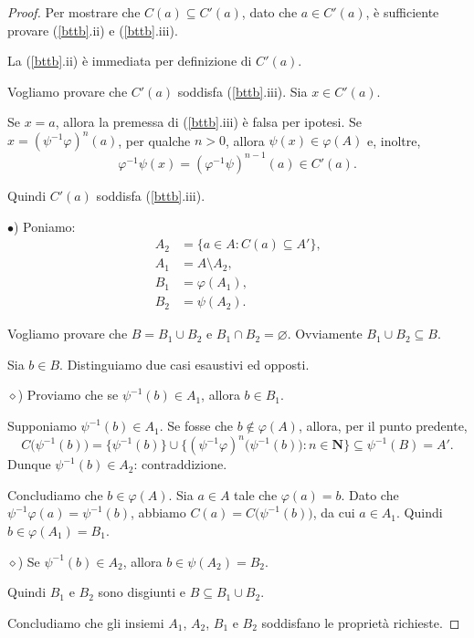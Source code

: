 \documentclass[a4paper,oneside,11pt]{book}
\theoremstyle{definition} \newtheorem{Def}{Definizione}
\theoremstyle{plain} \newtheorem{teo}{Teorema}
\theoremstyle{plain} \newtheorem{cor}[teo]{Corollario}
\theoremstyle{definition} \newtheorem{lem}[teo]{Lemma}
\theoremstyle{plain} \newtheorem{pro}[teo]{Proposizione}
\begin{document}
\begin{proof}
		Per mostrare che $C(a) \subseteq C'(a)$, dato che $a \in C'(a)$, è sufficiente provare (\ref{bttb}.ii) e (\ref{bttb}.iii).
		
		La (\ref{bttb}.ii) è immediata per definizione di $C'(a)$.
		
		Vogliamo provare che $C'(a)$ soddisfa (\ref{bttb}.iii). Sia $x \in C'(a)$.
		
		Se $x = a$, allora la premessa di (\ref{bttb}.iii) è falsa per ipotesi. Se $x = (\psi^{-1}\varphi)^n(a)$, per qualche $n>0$, allora $\psi(x) \in \varphi(A)$ e, inoltre,
		\begin{equation*}
			\varphi^{-1}\psi(x) = (\varphi^{-1}\psi)^{n-1}(a) \in C'(a) \text{.}
		\end{equation*}
				
		Quindi $C'(a)$ soddisfa (\ref{bttb}.iii).
		
		$\bullet$) Poniamo:
		\begin{equation*}
			\begin{aligned}
				A_2 &= \{a \in A : C(a) \subseteq A'\} \text{,}\\
				A_1 &= A \setminus A_2 \text{,}\\
				B_1 &= \varphi(A_1) \text{,}\\
				B_2 &= \psi(A_2) \text{.}
			\end{aligned}
		\end{equation*}
		
		Vogliamo provare che $B = B_1 \cup B_2$ e $B_1 \cap B_2 = \varnothing$. Ovviamente $B_1 \cup B_2 \subseteq B$.
		
		Sia $b \in B$. Distinguiamo due casi esaustivi ed opposti.
		
		$\diamond$) Proviamo che se $\psi^{-1}(b) \in A_1$, allora $b \in B_1$.
		
		Supponiamo $\psi^{-1}(b) \in A_1$. Se fosse che $b \notin \varphi(A)$, allora, per il punto predente,
		\begin{equation*}
			C\big(\psi^{-1}(b)\big) = \big\{\psi^{-1}(b)\big\} \cup \big\{(\psi^{-1}\varphi)^n\big(\psi^{-1}(b)\big) : n \in \mathbf{N}\big\} \subseteq \psi^{-1}(B) = A' \text{.}
		\end{equation*}
		Dunque $\psi^{-1}(b) \in A_2$: contraddizione. \lightning
		
		Concludiamo che $b \in \varphi(A)$. Sia $a \in A$ tale che $\varphi(a) = b$. Dato che $\psi^{-1}\varphi(a) = \psi^{-1}(b)$, abbiamo $C(a) = C\big(\psi^{-1}(b)\big)$, da cui $a \in A_1$. Quindi $b \in \varphi(A_1) = B_1$.
		
		$\diamond$) Se $\psi^{-1}(b) \in A_2$, allora $b \in \psi(A_2) = B_2$.
		
		Quindi $B_1$ e $B_2$ sono disgiunti e $B \subseteq B_1 \cup B_2$.
		
		Concludiamo che gli insiemi $A_1$, $A_2$, $B_1$ e $B_2$ soddisfano le proprietà richieste. 
	\end{proof}
\end{document}
